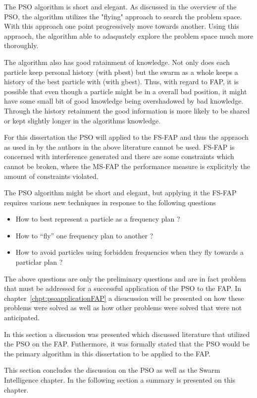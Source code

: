 The PSO algorithm is short and elegant. As discussed in the overview of the PSO, the algorithm utilizes the "flying" approach to search the problem space. With this approach one point progressively move towards another. Using this appraoch, the algorithm able to adaquately explore the problem space much more thoroughly.

The algorithm also has good ratainment of knowledge. Not only does each particle keep personal history (with pbest) but the swarm as a whole keeps a history of the best particle with (with gbest). Thus, with regard to FAP, it is possible that even though a particle might be in a overall bad position, it might have some small bit of good knowledge being overshadowed by bad knowledge. Through the history retainment the good information is more likely to be shared or kept slightly longer in the algorithms knowledge.

For this dissertation the PSO will applied to the FS-FAP and thus the appraoch as used in by the authors in the above literature cannot be used. FS-FAP is concerned with interference generated and there are some constraints which cannot be broken, where the MS-FAP the performance measure is explicityly the amount of constraints violated.

The PSO algorithm might be short and elegant, but applying it the FS-FAP requires various new techniques in response to the following questions
\begin{itemize}
\item How to best represent a particle as a frequency plan ?
\item How to ``fly'' one frequency plan to another ?
\item How to avoid particles using forbidden frequencies when they fly towards a particlar plan ?
\end{itemize}

The above questions are only the preliminary questions and are in fact problem that must be addressed for a successful application of the PSO to the FAP. In chapter~\ref{chpt:psoapplicationFAP} a disucussion will be presented on how these problems were solved as well as how other problems were solved that were not anticipated.

In this section a discussion was presented which discussed literature that utilized the PSO on the FAP. Futhermore, it was formally stated that the PSO would be the primary algorithm in this dissertation to be applied to the FAP.

This section concludes the discussion on the PSO as well as the Swarm Intelligence chapter. In the following section a summary is presented on this chapter.
